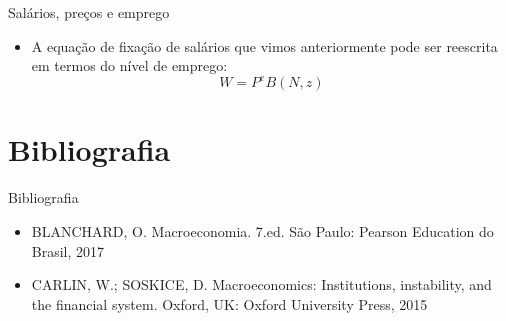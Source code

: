 \documentclass[10pt]{beamer}
\begin{document}
\begin{frame}
    {Salários, preços e emprego}
    \begin{itemize}
        \item A equação de fixação de salários que vimos anteriormente pode ser reescrita em termos do nível de emprego:
        \begin{equation}
            W = P^e B(N, z)
        \end{equation}
    \end{itemize}
\end{frame}
\section{Bibliografia}
\begin{frame}{ Bibliografia}
    \begin{itemize}                
        \item BLANCHARD, O. Macroeconomia. 7.ed. São Paulo: Pearson Education do Brasil, 2017\medskip                
        \item CARLIN, W.; SOSKICE, D. Macroeconomics: Institutions, instability, and the financial system. Oxford, UK: Oxford University Press, 2015\medskip        
    \end{itemize}
\end{frame}
\end{document}
